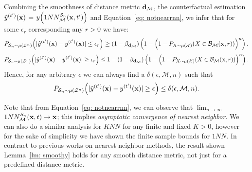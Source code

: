 Combining the smoothness of distance metric $\mathbf{d}_\mathcal{M}$, the counterfactual estimation $\hat{y}^{(t')}(\mathbf{x})$ = $y\Big(1NN^{\mathcal{S}_n}_{\mathcal{M}}(\mathbf{x},t')\Big)$ and Equation~\ref{eq: notnearrnn}, we infer that for some $\epsilon_r$ corresponding any $r>0$ we have:
\begin{eqnarray*}
    P_{\mathcal{S}_n \sim \mu(\mathcal{Z}^n)}\Big( |\hat{y}^{(t')}(\mathbf{x}) - y^{(t')}(\mathbf{x})| \leq \epsilon_r \Big) \geq 
    \left(1-\beta_{\mathbf{d}_\mathcal{M}}\right)\left(1-\Big(1 - P_{X\sim\mu(\mathcal{X})}(X \in \mathcal{B}_{\mathcal{M}}(\mathbf{x},r))\Big)^{n}\right).
\end{eqnarray*}
\begin{eqnarray*}
    P_{\mathcal{S}_n \sim \mu(\mathcal{Z}^n)}\Big( |\hat{y}^{(t')}(\mathbf{x}) - y^{(t')}(\mathbf{x})| \geq \epsilon_r \Big) \leq 1 -
    \left(1-\beta_{\mathbf{d}_\mathcal{M}}\right)\left(1-\Big(1 - P_{X\sim\mu(\mathcal{X})}(X \in \mathcal{B}_{\mathcal{M}}(\mathbf{x},r))\Big)^{n}\right).
\end{eqnarray*}
Hence, for any arbitrary $\epsilon$ we can always find a $\delta(\epsilon,\mathcal{M},n)$ such that 
\begin{equation}
  P_{\mathcal{S}_n \sim \mu(\mathcal{Z}^n)}\Big( |\hat{y}^{(t')}(\mathbf{x}) - y^{(t')}(\mathbf{x})| \geq \epsilon \Big) \leq \delta(\epsilon,\mathcal{M},n). 
\end{equation}


Note that from Equation~\ref{eq: notnearrnn}, we can observe that $\lim_{n\to\infty}$ $1NN^{\mathcal{S}_n}_{\mathcal{M}}(\mathbf{x},t) \to \mathbf{x}$; this implies \textit{asymptotic convergence of nearest neighbor}. We can also do a similar analysis for $KNN$ for any finite and fixed $K>0$, however for the sake of simplicity we have shown the finite sample bounds for $1NN$. In contract to previous works on nearest neighbor methods, the result shown Lemma~\ref{lm: smoothy} holds for any smooth distance metric, not just for a predefined distance metric.


